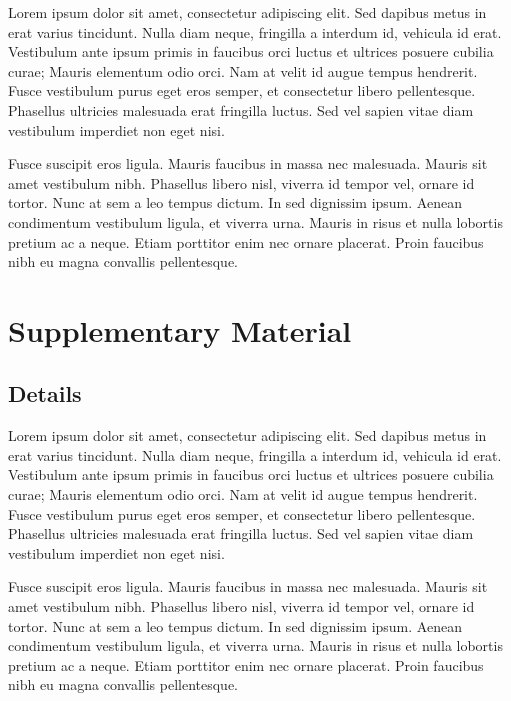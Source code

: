 \documentclass{brandeis-thesis3.2}
\begin{document}
Lorem ipsum dolor sit amet, consectetur adipiscing elit. Sed dapibus metus in erat varius tincidunt. Nulla diam neque, fringilla a interdum id, vehicula id erat. Vestibulum ante ipsum primis in faucibus orci luctus et ultrices posuere cubilia curae; Mauris elementum odio orci. Nam at velit id augue tempus hendrerit. Fusce vestibulum purus eget eros semper, et consectetur libero pellentesque. Phasellus ultricies malesuada erat fringilla luctus. Sed vel sapien vitae diam vestibulum imperdiet non eget nisi.

Fusce suscipit eros ligula. Mauris faucibus in massa nec malesuada. Mauris sit amet vestibulum nibh. Phasellus libero nisl, viverra id tempor vel, ornare id tortor. Nunc at sem a leo tempus dictum. In sed dignissim ipsum. Aenean condimentum vestibulum ligula, et viverra urna. Mauris in risus et nulla lobortis pretium ac a neque. Etiam porttitor enim nec ornare placerat. Proin faucibus nibh eu magna convallis pellentesque.



\begin{singlespacing}


\end{singlespacing}


\appendix

\chapter{Supplementary Material}

\section{Details}

Lorem ipsum dolor sit amet, consectetur adipiscing elit. Sed dapibus metus in erat varius tincidunt. Nulla diam neque, fringilla a interdum id, vehicula id erat. Vestibulum ante ipsum primis in faucibus orci luctus et ultrices posuere cubilia curae; Mauris elementum odio orci. Nam at velit id augue tempus hendrerit. Fusce vestibulum purus eget eros semper, et consectetur libero pellentesque. Phasellus ultricies malesuada erat fringilla luctus. Sed vel sapien vitae diam vestibulum imperdiet non eget nisi.

Fusce suscipit eros ligula. Mauris faucibus in massa nec malesuada. Mauris sit amet vestibulum nibh. Phasellus libero nisl, viverra id tempor vel, ornare id tortor. Nunc at sem a leo tempus dictum. In sed dignissim ipsum. Aenean condimentum vestibulum ligula, et viverra urna. Mauris in risus et nulla lobortis pretium ac a neque. Etiam porttitor enim nec ornare placerat. Proin faucibus nibh eu magna convallis pellentesque.
\end{document}

